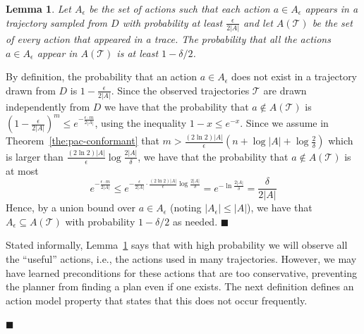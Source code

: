 \documentclass{article}
\newtheorem{lemma}{Lemma}
\newenvironment{proof}{\noindent{\bf Proof:~~}}{\qed}
\newcommand{\qed}{\hfill\ensuremath{\blacksquare}}
\begin{document}
\begin{proof}
		\begin{lemma}
			Let $A_\epsilon$ be the set of actions such that each action $a\in A_\epsilon$ appears in a trajectory sampled from $D$ with probability at least $\frac{\epsilon}{2|A|}$ and let $A(\mathcal{T})$ be the set of every action that appeared in a trace. 
			The probability that all the actions $a\in A_\epsilon$ 
			appear in $A(\mathcal{T})$ is at least $1-\delta/2$.
			\label{lem:sufficientActions}
		\end{lemma}
		\begin{proof}
			By definition, the probability that an action $a\in A_\epsilon$ does not exist in a trajectory drawn from $D$ is $1-\frac{\epsilon}{2|A|}$. 
			Since the observed trajectories $\mathcal{T}$ are drawn independently from $D$ we have that the probability that $a\notin A(\mathcal{T})$ is
			$(1-\frac{\epsilon}{2|A|})^m\leq e^{-\frac{\epsilon\cdot m}{2|A|}}$, 
			using the inequality $1-x\leq e^{-x}$. 
			Since we assume in Theorem~\ref{the:pac-conformant} that $m>\frac{(2\ln 2)|A|}{\epsilon}(n+\log |A|+\log\frac{2}{\delta})$
			which is larger than $\frac{(2\ln 2)|A|}{\epsilon}\log\frac{2|A|}{\delta}$, 
			we have that the probability that $a\notin A(\mathcal{T})$ is at most 
			\begin{equation}
			e^{-\frac{\epsilon\cdot m}{2|A|}}
			\leq e^{-\frac{\epsilon}{2|A|} \cdot \frac{(2\ln 2)|A|}{\epsilon}\log\frac{2|A|}{\delta}}
			=e^{-\ln\frac{2|A|}{\delta}}=\frac{\delta}{2|A|}
			\end{equation}
			Hence, by a union bound over $a\in A_\epsilon$ (noting $|A_\epsilon|\leq |A|$), we have that $A_\epsilon\subseteq A(\mathcal{T})$ with probability $1-\delta/2$ as needed.
		\end{proof}
		
		Stated informally, Lemma~\ref{lem:sufficientActions} says that with high probability we will observe
		all the ``useful'' actions, i.e., the actions used in many trajectories. However, we may have learned 
		preconditions for these actions that are too conservative, 
		preventing the planner from finding a plan even if one exists. 
		The next definition defines an action model property that states that this does not occur frequently. 
		
		

\end{proof}
\end{document}
